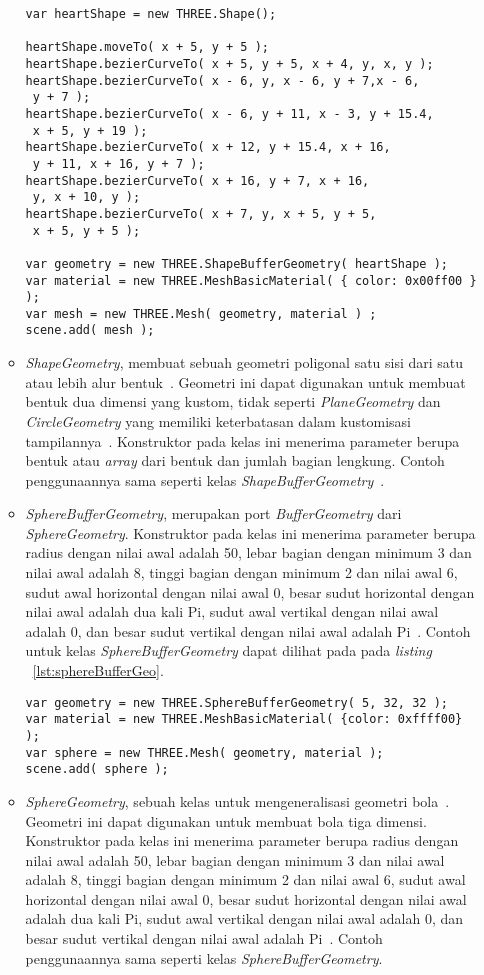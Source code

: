 \begin{itemize}
\begin{itemize}
\begin{lstlisting}[caption={Contoh penggunaan kelas {\it ShapeBufferGeometry}.}, label={lst:shapeBufferGeo},captionpos=b]
var heartShape = new THREE.Shape();

heartShape.moveTo( x + 5, y + 5 );
heartShape.bezierCurveTo( x + 5, y + 5, x + 4, y, x, y );
heartShape.bezierCurveTo( x - 6, y, x - 6, y + 7,x - 6,
 y + 7 );
heartShape.bezierCurveTo( x - 6, y + 11, x - 3, y + 15.4,
 x + 5, y + 19 );
heartShape.bezierCurveTo( x + 12, y + 15.4, x + 16,
 y + 11, x + 16, y + 7 );
heartShape.bezierCurveTo( x + 16, y + 7, x + 16,
 y, x + 10, y );
heartShape.bezierCurveTo( x + 7, y, x + 5, y + 5,
 x + 5, y + 5 );

var geometry = new THREE.ShapeBufferGeometry( heartShape );
var material = new THREE.MeshBasicMaterial( { color: 0x00ff00 } );
var mesh = new THREE.Mesh( geometry, material ) ;
scene.add( mesh );
\end{lstlisting}
		\item {\it ShapeGeometry}, membuat sebuah geometri poligonal satu sisi dari satu atau lebih alur bentuk~\cite{threejs}. Geometri ini dapat digunakan untuk membuat bentuk dua dimensi yang kustom, tidak seperti {\it PlaneGeometry} dan {\it CircleGeometry} yang memiliki keterbatasan dalam kustomisasi tampilannya~\cite{learningThreejs}. Konstruktor pada kelas ini menerima parameter berupa bentuk atau {\it array} dari bentuk dan jumlah bagian lengkung. Contoh penggunaannya sama seperti kelas {\it ShapeBufferGeometry}~\cite{threejs}.
		\item {\it SphereBufferGeometry}, merupakan port {\it BufferGeometry} dari {\it SphereGeometry}. Konstruktor pada kelas ini menerima parameter berupa radius dengan nilai awal adalah 50, lebar bagian dengan minimum 3 dan nilai awal adalah 8, tinggi bagian dengan minimum 2 dan nilai awal 6, sudut awal horizontal dengan nilai awal 0, besar sudut horizontal dengan nilai awal adalah dua kali Pi, sudut awal vertikal dengan nilai awal adalah 0, dan besar sudut vertikal dengan nilai awal adalah Pi~\cite{threejs}. Contoh untuk kelas {\it SphereBufferGeometry} dapat dilihat pada pada {\it listing} ~\ref{lst:sphereBufferGeo}.
\begin{lstlisting}[caption={Contoh penggunaan kelas {\it SphereBufferGeometry}.}, label={lst:sphereBufferGeo},captionpos=b]
var geometry = new THREE.SphereBufferGeometry( 5, 32, 32 );
var material = new THREE.MeshBasicMaterial( {color: 0xffff00} );
var sphere = new THREE.Mesh( geometry, material );
scene.add( sphere );
\end{lstlisting}
		\item {\it SphereGeometry}, sebuah kelas untuk mengeneralisasi geometri bola~\cite{threejs}. Geometri ini dapat digunakan untuk membuat bola tiga dimensi. Konstruktor pada kelas ini menerima parameter berupa radius dengan nilai awal adalah 50, lebar bagian dengan minimum 3 dan nilai awal adalah 8, tinggi bagian dengan minimum 2 dan nilai awal 6, sudut awal horizontal dengan nilai awal 0, besar sudut horizontal dengan nilai awal adalah dua kali Pi, sudut awal vertikal dengan nilai awal adalah 0, dan besar sudut vertikal dengan nilai awal adalah Pi~\cite{threejs}. Contoh penggunaannya sama seperti kelas {\it SphereBufferGeometry}.

\end{itemize}
\end{itemize}

